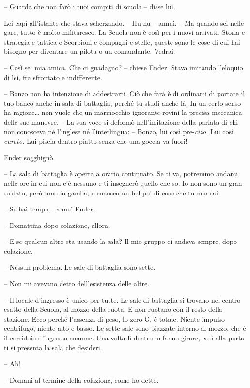 {-- Guarda che non farò i tuoi compiti di scuola -- disse lui.}

{Lei capì all'istante che stava scherzando. -- Hu-hu -- annuì. -- Ma
	quando sei nelle gare, tutto è molto militaresco. La Scuola non è così
	per i nuovi arrivati. Storia e strategia e tattica e Scorpioni e
	compagni e stelle, queste sono le cose di cui hai bisogno per diventare
	un pilota o un comandante. Vedrai.}

{-- Così sei mia amica. Che ci guadagno? -- chiese Ender. Stava imitando
	l'eloquio di lei, fra sfrontato e indifferente.}

{-- Bonzo non ha intenzione di addestrarti. Ciò che farà è di ordinarti
	di portare il tuo banco anche in sala di battaglia, perché tu studi
	anche là. In un certo senso ha ragione\ldots{} non vuole che un
	marmocchio ignorante rovini la precisa meccanica delle sue manovre. --
	La sua voce si deformò nell'imitazione della parlata di chi non
	conosceva né l'inglese né l'interlingua: -- Bonzo, lui così
	pre-\emph{cizo.} Lui così \emph{curato.} Lui piscia dentro piatto senza
	che una goccia va fuori!}

{Ender sogghignò.}

{-- La sala di battaglia è aperta a orario continuato. Se ti va,
	potremmo andarci nelle ore in cui non c'è nessuno e ti insegnerò quello
	che so. Io non sono un gran soldato, però sono in gamba, e conosco un
	bel po' di cose che tu non sai.}

{-- Se hai tempo -- annuì Ender.}

{-- Domattina dopo colazione, allora.}

{-- E se qualcun altro sta usando la sala? Il mio gruppo ci andava
	sempre, dopo colazione.}

{-- Nessun problema. Le sale di battaglia sono sette.}

{-- Non mi avevano detto dell'esistenza delle altre.}

{-- Il locale d'ingresso è unico per tutte. Le sale di battaglia si
	trovano nel centro esatto della Scuola, al mozzo della ruota. E non
	ruotano con il resto della stazione. Ecco perché l'assenza di peso, lo
	zero-G, è totale. Niente impulso centrifugo, niente alto e basso. Le
	sette sale sono piazzate intorno al mozzo, che è il corridoio d'ingresso
	comune. Una volta lì dentro lo fanno girare, così alla porta ti si
	presenta la sala che desideri.}

{-- Ah!}

{-- Domani al termine della colazione, come ho detto.}

